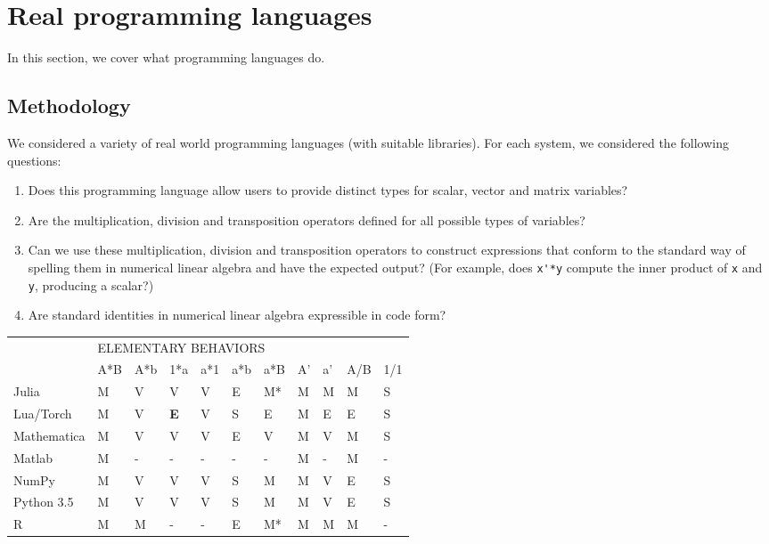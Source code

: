 \section{Real programming languages}

In this section, we cover what programming languages do.

\subsection{Methodology}

We considered a variety of real world programming languages (with suitable libraries).
For each system, we considered the following questions:

\begin{enumerate}

\item
Does this programming language allow users to provide distinct types for scalar, vector and matrix variables?

\item
Are the multiplication, division and transposition operators defined for all possible types of variables?

\item
Can we use these multiplication, division and transposition operators to construct expressions that conform to the standard way of spelling them in numerical linear algebra and have the expected output? (For example, does \verb|x'*y| compute the inner product of \verb|x| and \verb|y|, producing a scalar?)

\item
Are standard identities in numerical linear algebra expressible in code form?

\end{enumerate}

\begin{tabular}{|l|l|l|l|l|l|l|l|l|l|l|}
\cline{2-11}
\multicolumn{1}{l|}{} & \multicolumn{10}{l|}{ELEMENTARY BEHAVIORS}\tabularnewline
\cline{2-11}
\multicolumn{1}{l|}{} & A{*}B & A{*}b & 1{*}a & a{*}1 & a{*}b & a{*}B & A' & a' & A/B & 1/1\tabularnewline
\hline
Julia & M & V & V & V & E & M{*} & M & M & M & S\tabularnewline
\hline
Lua/Torch & M & V & \textbf{E} & V & S & E & M & E & E & S\tabularnewline
\hline
Mathematica & M & V & V & V & E & V & M & V & M & S\tabularnewline
\hline
Matlab & M & - & - & - & - & - & M & - & M & -\tabularnewline
\hline
NumPy & M & V & V & V & S & M & M & V & E & S\tabularnewline
\hline
Python 3.5 & M & V & V & V & S & M & M & V & E & S\tabularnewline
\hline
R & M & M & - & - & E & M{*} & M & M & M & -\tabularnewline
\hline
\end{tabular}

